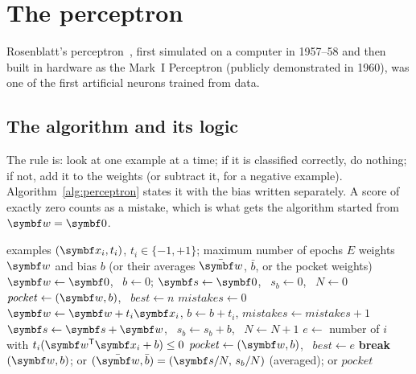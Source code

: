 \documentclass[11pt]{article}
\newcommand{\w}{\vect{w}}
\begin{document}
\section{The perceptron}\label{sec:perceptron}

Rosenblatt's perceptron~\cite{rosenblatt1958}, first simulated on a computer in 1957--58 and then built in hardware as
the Mark~I Perceptron (publicly demonstrated in 1960), was one of the first artificial neurons trained from data.

\subsection{The algorithm and its logic}

The rule is: look at one example at a time; if it is classified correctly, do nothing; if not, add it to the weights (or
subtract it, for a negative example). Algorithm~\ref{alg:perceptron} states it with the bias written separately. A score
of exactly zero counts as a mistake, which is what gets the algorithm started from $\w = \vect{0}$.

\begin{algorithm}[htbp]
\caption{The perceptron (primal form), with the averaged and pocket variants of Section~\ref{sec:avgperc}.}\label{alg:perceptron}
\label{alg:avgperceptron}
\begin{algorithmic}[1]
\Require examples $(\x_i, t_i)$, $t_i \in \{-1, +1\}$; maximum number of epochs $E$
\Ensure weights $\w$ and bias $b$ (or their averages $\bar{\w}$, $\bar b$, or the pocket weights)
\State $\w \gets \vect{0}$, \ $b \gets 0$; \quad $\vect{s} \gets \vect{0}$, \ $s_b \gets 0$, \ $N \gets 0$
\State $\mathit{pocket} \gets (\w, b)$, \ $\mathit{best} \gets n$ 
  \State $\mathit{mistakes} \gets 0$
   
    \If{$t_i(\w\T\x_i + b) \le 0$} 
      \State $\w \gets \w + t_i\x_i$, \quad $b \gets b + t_i$, \quad $\mathit{mistakes} \gets \mathit{mistakes} + 1$
    \EndIf
    \State $\vect{s} \gets \vect{s} + \w$, \ $s_b \gets s_b + b$, \ $N \gets N + 1$ 
  \EndFor
  \State $e \gets$ number of $i$ with $t_i(\w\T\x_i + b) \le 0$ 
   $\mathit{pocket} \gets (\w, b)$, \ $\mathit{best} \gets e$ \EndIf
   \textbf{break} 
  \EndIf
\EndFor
\State \Return $(\w, b)$; or $(\bar{\w}, \bar b) = (\vect{s}/N,\, s_b/N)$ (averaged); or $\mathit{pocket}$
\end{algorithmic}
\end{algorithm}
\end{document}
